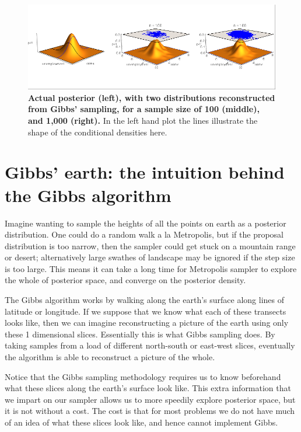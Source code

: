 \documentclass[11pt,fullpage]{book}
\begin{document}
\begin{figure}
\centerline{\includegraphics[width=1\textwidth]{Gibbs_crimeMultivariateNormalSlice.png}}
\caption{\textbf{Actual posterior (left), with two distributions reconstructed from Gibbs' sampling, for a sample size of 100 (middle), and 1,000 (right).} In the left hand plot the lines illustrate the shape of the conditional densities here.}\label{fig:Gibbs_crimeMultivariateNormalSlice}
\end{figure}

\section{Gibbs' earth: the intuition behind the Gibbs algorithm}
Imagine wanting to sample the heights of all the points on earth as a posterior distribution. One could do a random walk a la Metropolis, but if the proposal distribution is too narrow, then the sampler could get stuck on a mountain range or desert; alternatively large swathes of landscape may be ignored if the step size is too large. This means it can take a long time for Metropolis sampler to explore the whole of posterior space, and converge on the posterior density. 

The Gibbs algorithm works by walking along the earth's surface along lines of latitude or longitude. If we suppose that we know what each of these transects looks like, then we can imagine reconstructing a picture of the earth using only these 1 dimensional slices. Essentially this is what Gibbs sampling does. By taking samples from a load of different north-south or east-west slices, eventually the algorithm is able to reconstruct a picture of the whole.

Notice that the Gibbs sampling methodology requires us to know beforehand what these slices along the earth's surface look like. This extra information that we impart on our sampler allows us to more speedily explore posterior space, but it is not without a cost. The cost is that for most problems we do not have much of an idea of what these slices look like, and hence cannot implement Gibbs. 
\end{document}
